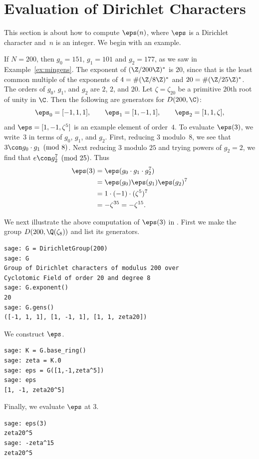 \section{Evaluation of Dirichlet Characters}\label{sec:evaldir}
This section is about how to compute $\eps(n)$, where $\eps$
is a Dirichlet character and~$n$ is an integer.
We begin with an example.
\begin{example}\label{ex:char}
If $N=200$, then $g_0=151$, $g_1=101$ and $g_2=177$, as
we saw in Example~\ref{ex:mingens}.  The
exponent of $(\Z/200\Z)^*$ is $20$, since that
is the least common multiple of the exponents of
$4=\#(\Z/8\Z)^*$ and $20=\#(\Z/25\Z)^*$.
The orders of $g_0$, $g_1$, and $g_2$ are $2$, $2$, and $20$.
Let $\zeta=\zeta_{20}$ be a primitive $20$th root of
unity in $\C$.  Then the following are generators
for $D(200,\C)$:
$$
  \eps_0 = [-1,1,1],\qquad
  \eps_1 = [1,-1,1],\qquad
  \eps_2 = [1,1,\zeta],
$$
and $\eps=[1,-1,\zeta^5]$ is an example element of order~$4$.
To evaluate $\eps(3)$, we write~$3$ in
terms of $g_0$, $g_1$, and $g_2$.
First, reducing $3$ modulo~$8$, we see that 
$3 \con g_0 \cdot g_1\pmod{8}$.  Next 
reducing $3$ modulo $25$ and trying powers of 
$g_2=2$, we find that $e\con g_2^7\pmod{25}$.  
Thus 
\begin{align*}
  \eps(3) &= \eps(g_0 \cdot g_1 \cdot g_2^7)\\
          &= \eps(g_0) \eps(g_1) \eps(g_2)^7\\
          &= 1 \cdot (-1) \cdot (\zeta^5)^7\\
          &= -\zeta^{35} = -\zeta^{15}.
\end{align*}

We next illustrate the above computation of $\eps(3)$ in \sage.
First we make the group $D(200,\Q(\zeta_8))$ and list its
generators.
\begin{verbatim}
sage: G = DirichletGroup(200)
sage: G
Group of Dirichlet characters of modulus 200 over 
Cyclotomic Field of order 20 and degree 8
sage: G.exponent()
20
sage: G.gens()
([-1, 1, 1], [1, -1, 1], [1, 1, zeta20])
\end{verbatim}%

We construct $\eps$.
\begin{verbatim}
sage: K = G.base_ring()
sage: zeta = K.0
sage: eps = G([1,-1,zeta^5])
sage: eps
[1, -1, zeta20^5]
\end{verbatim}%

Finally, we evaluate $\eps$ at $3$.
\begin{verbatim}
sage: eps(3)
zeta20^5
sage: -zeta^15
zeta20^5
\end{verbatim}


\end{example}


